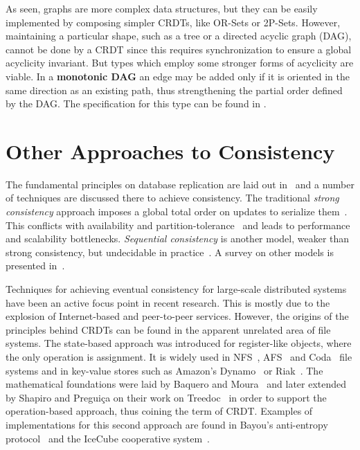As seen, graphs are more complex data structures, but they can be easily
implemented by composing simpler CRDTs, like OR-Sets or 2P-Sets. However,
maintaining a particular shape, such as a tree or a directed acyclic graph
(DAG), cannot be done by a CRDT since this requires synchronization to ensure a
global acyclicity invariant. But types which employ some stronger forms of
acyclicity are viable. In a \textbf{monotonic DAG} an edge may be added only if
it is oriented in the same direction as an existing path, thus strengthening the
partial order defined by the DAG. The specification for this type can be found
in \cite{shapiro:inria-00555588}.

\section{Other Approaches to Consistency}
\label{sec:other_approaches_to_consistency}

The fundamental principles on database replication are laid out
in~\cite{lindsay} and a number of techniques are discussed there to achieve
consistency. The traditional \textit{strong consistency} approach imposes a
global total order on updates to serialize
them~\cite{Lamport:1978:TCO:359545.359563}. This conflicts with availability and
partition-tolerance~\cite{Gilbert:2002:BCF:564585.564601} and leads to
performance and scalability bottlenecks. \textit{Sequential consistency} is
another model, weaker than strong consistency, but undecidable in
practice~\cite{Qadeer:2003:VSC:939835.940001}. A survey on other models is
presented in~\cite{Mosberger:1993:MCM:160551.160553}.

Techniques for achieving eventual consistency for large-scale distributed
systems have been an active focus point in recent research. This is mostly due
to the explosion of Internet-based and peer-to-peer services. However, the
origins of the principles behind CRDTs can be found in the apparent unrelated
area of file systems. The state-based approach was introduced for register-like
objects, where the only operation is assignment. It is widely used in
NFS~\cite{Sandberg85designand}, AFS~\cite{Howard:1988:SPD:35037.35059} and
Coda~\cite{Kistler:1992:DOC:146941.146942} file systems and in key-value stores
such as Amazon's Dynamo~\cite{DeCandia:2007:DAH:1294261.1294281} or
Riak~\cite{riak}. The mathematical foundations were laid by Baquero and
Moura~\cite{scadt4} and later extended by Shapiro and Preguiça on their work on
Treedoc~\cite{Preguica:2009:CRD:1584339.1584604} in order to support the
operation-based approach, thus coining the term of CRDT. Examples of
implementations for this second approach are found in Bayou’s anti-entropy
protocol~\cite{Petersen:1997:FUP:268998.266711} and the IceCube cooperative
system~\cite{preguica:inria-00445758}.

